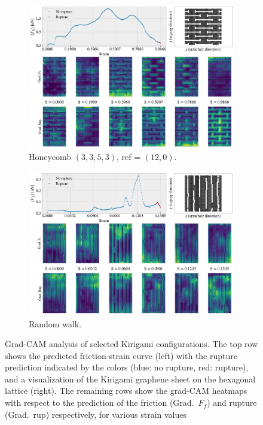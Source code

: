 \begin{figure}[!htb]\ContinuedFloat
  \centering
  \begin{subfigure}[t]{1\textwidth}
      \centering
      \includegraphics[width=0.75\linewidth]{figures/search/grad_cam_hon_3_3_5_3_12_0.pdf}
      \caption{Honeycomb $(3,3,5,3)$, ref = $(12,0)$.}
      \label{fig:GC_hon_search}
  \end{subfigure}
  \hfill
  \vspace{5mm}
  \begin{subfigure}[t]{1\textwidth}
    \centering
    \includegraphics[width=0.75\linewidth]{figures/search/grad_cam_RW_search_max_drop0.pdf}
    \caption{Random walk.}
    \label{fig:GC_RW_search}
\end{subfigure}
\hfill
  \caption{Grad-CAM analysis of selected Kirigami configurations. The top row
  shows the predicted friction-strain curve (left) with the rupture prediction
  indicated by the colors (blue: no rupture, red: rupture), and a visualization
  of the Kirigami graphene sheet on the hexagonal lattice (right). The remaining
  rows show the grad-CAM heatmaps with respect to the prediction of the friction
  (Grad.\ $F_f$) and rupture (Grad.\ rup) respectively, for various strain values
}
\end{figure}
